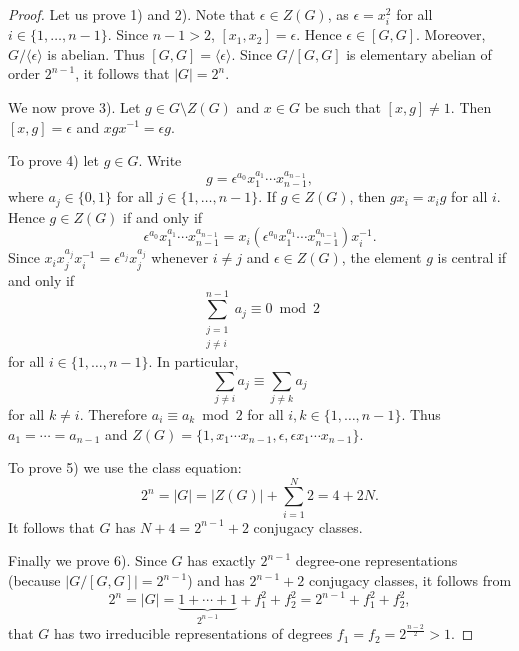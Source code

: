  \begin{proof}
     Let us prove 1) and 2). Note that $\epsilon\in Z(G)$, as
     $\epsilon=x_i^2$ for all 
 	$i\in\{1,\dots,n-1\}$. Since $n-1>2$, $[x_1,x_2]=\epsilon$. Hence 
 	$\epsilon\in [G,G]$. Moreover, $G/\langle\epsilon\rangle$ is abelian. Thus 
 	$[G,G]=\langle \epsilon\rangle$. Since $G/[G,G]$ is elementary 
 	abelian of order 
 	$2^{n-1}$, it follows that 
 	$|G|=2^n$. 

 	We now prove 3). Let $g\in G\setminus Z(G)$ and 
 	$x\in G$ be such that $[x,g]\ne 1$. Then $[x,g]=\epsilon$ and 
 	$xgx^{-1}=\epsilon g$. 

 	To prove 4) let $g\in G$. Write
 	\[
 		g=\epsilon^{a_0}x_1^{a_1}\cdots x_{n-1}^{a_{n-1}},
 	\]
 	where $a_j\in\{0,1\}$ for all $j\in\{1,\dots,n-1\}$. 
 	If $g\in Z(G)$, then $gx_i=x_ig$ for all $i$. Hence 
 	$g\in Z(G)$ if and only if 
 	\[
 		\epsilon^{a_0}x_1^{a_1}\cdots x_{n-1}^{a_{n-1}}=x_i(\epsilon^{a_0}x_1^{a_1}\cdots x_{n-1}^{a_{n-1}})x_i^{-1}.
 	\]
 	Since $x_ix_j^{a_j}x_i^{-1}=\epsilon^{a_j}x_j^{a_j}$ 
 	whenever $i\ne j$ and $\epsilon\in Z(G)$, the element $g$ is 
 	central if and only if 
 	\[
 		\sum_{\substack{j=1\\j\ne i}}^{n-1}a_j\equiv 0\bmod 2
 	\]
 	for all $i\in\{1,\dots,n-1\}$. In particular, 
 	\[
 	\sum_{j\ne i}a_j\equiv \sum_{j\ne k}a_j
 	\]
 	for all $k\ne i$. Therefore $a_i\equiv a_k\bmod 2$ for all 
 	$i,k\in\{1,\dots,n-1\}$. Thus $a_1=\cdots=a_{n-1}$ and  
 	$Z(G)=\{1,x_1\cdots x_{n-1},\epsilon,\epsilon x_1\cdots
 	x_{n-1}\}$. 
	
     To prove 5) we use the class equation:
     \[
 		2^n=|G|=|Z(G)|+\sum_{i=1}^N2=4+2N. 
 	\]
 	It follows that $G$ has $N+4=2^{n-1}+2$ conjugacy classes.
	
 	Finally we prove 6). 
 	Since $G$ 
 	has exactly $2^{n-1}$ degree-one representations (because 
 	$|G/[G,G]|=2^{n-1}$) and 
 	has $2^{n-1}+2$ conjugacy classes, 
 	it follows from 
 	\[
 		2^n=|G|=\underbrace{1+\cdots+1}_{2^{n-1}}+f_1^2+f_2^2=2^{n-1}+f_1^2+f_2^2,
 	\]
 	that $G$ has two irreducible representations
 	of degrees $f_1=f_2=2^{\frac{n-2}{2}}>1$. 
 \end{proof}

